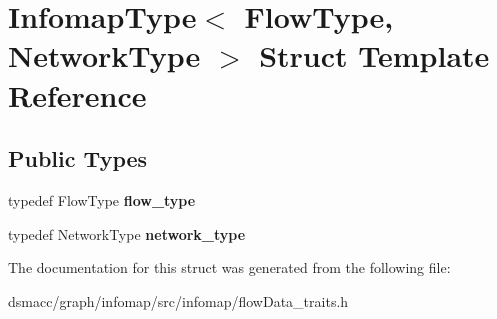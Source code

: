 \hypertarget{structInfomapType}{}\section{Infomap\+Type$<$ Flow\+Type, Network\+Type $>$ Struct Template Reference}
\label{structInfomapType}
\subsection*{Public Types}
\begin{DoxyCompactItemize}
\item 
\mbox{\label{structInfomapType_aaa15478840fd0d5404d1fae5df2bda60}} 
typedef Flow\+Type {\bfseries flow\+\_\+type}
\item 
\mbox{\label{structInfomapType_a213c16a3ad120735f39c4f3850f90934}} 
typedef Network\+Type {\bfseries network\+\_\+type}
\end{DoxyCompactItemize}


The documentation for this struct was generated from the following file\+:\begin{DoxyCompactItemize}
\item 
dsmacc/graph/infomap/src/infomap/flow\+Data\+\_\+traits.\+h\end{DoxyCompactItemize}
